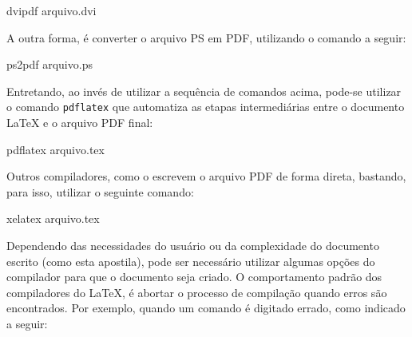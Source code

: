 \begin{meucomando}
dvipdf arquivo.dvi 
\end{meucomando}

A outra forma, é converter o arquivo PS em PDF, utilizando o comando a seguir:

\begin{meucomando}
ps2pdf arquivo.ps 
\end{meucomando}

Entretando, ao invés de utilizar a sequência de comandos acima, pode-se utilizar o comando {\tt pdflatex} que automatiza as etapas intermediárias entre o documento \LaTeX{} e o arquivo PDF final:

\begin{meucomando}
pdflatex arquivo.tex
\end{meucomando}

Outros compiladores, como o \XeLaTeX{} escrevem o arquivo PDF de forma direta, bastando, para isso, utilizar o seguinte comando:

\begin{meucomando}
xelatex arquivo.tex
\end{meucomando}

Dependendo das necessidades do usuário ou da complexidade do documento escrito (como esta apostila), pode ser necessário utilizar algumas opções do compilador para que o documento seja criado. O comportamento padrão dos compiladores do \LaTeX{}, é abortar o processo de compilação quando erros são encontrados. Por exemplo, quando um comando é digitado errado, como indicado a seguir:


